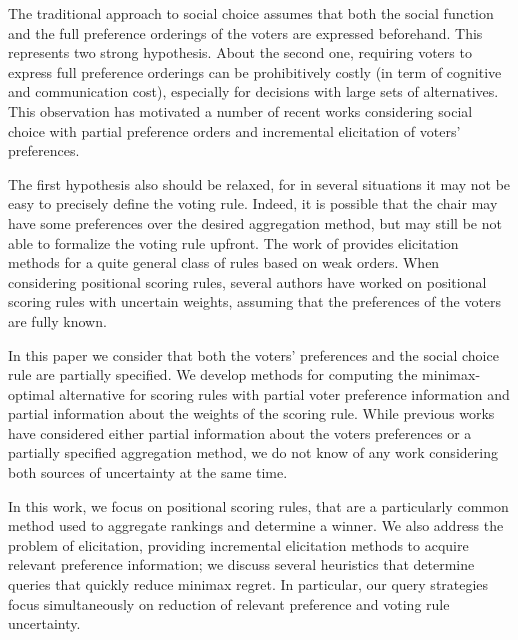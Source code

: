 The traditional approach to social choice assumes that both the social function and the full preference orderings of the voters are expressed beforehand. This represents two strong hypothesis.
About the second one, requiring voters to express full preference orderings can be prohibitively costly (in term of cognitive and communication cost), especially for decisions with large sets of alternatives.
This observation has motivated a number of recent works considering social choice with partial preference orders  \citep{Xia2008,Pini2009,Konczak05} and incremental elicitation \citep{Kalech2011, Lu2011, Naamani-Dery2015} of voters’ preferences. 

The first hypothesis also should be relaxed, for in several situations it may not be easy to precisely define the voting rule.
Indeed, it is possible that the chair may have some preferences over the desired aggregation method, but may still be not able to formalize the voting rule upfront.
The work of \citet{Cailloux2014} provides elicitation methods for a quite general class of rules based on weak orders.
When considering positional scoring rules, several authors \citep{Stein1994, Llamazares2013, Viappiani2018} have worked on positional scoring rules with uncertain weights, assuming that the preferences of the voters are fully known.

In this paper we consider that both the voters’ preferences and the social choice rule are partially specified.
We develop methods for computing the minimax-optimal alternative for scoring rules with partial voter preference information and partial information about the weights of the scoring rule.
While previous works have considered either partial information about the voters preferences or a partially specified aggregation method, we do not know of any work considering both sources of uncertainty at the same time.

In this work, we focus on positional scoring rules, that  are a particularly common method used to aggregate rankings and determine a winner.
We also address the problem of elicitation, providing incremental elicitation methods to acquire relevant preference information; we discuss  several heuristics that determine queries that quickly reduce minimax regret.
In particular, our query strategies focus simultaneously on reduction of relevant preference and voting rule uncertainty.


